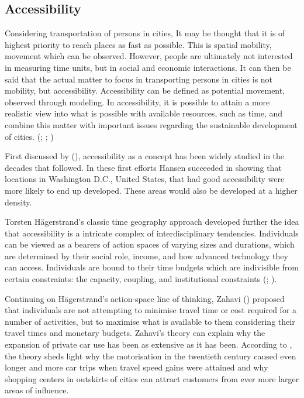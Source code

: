 \newpage
\subsection{Accessibility}
\justify

Considering transportation of persons in cities, It may be thought that it is of highest priority to reach places as fast as possible. This is spatial mobility, movement which can be observed. However, people are ultimately not interested in measuring time units, but in social and economic interactions. It can then be said that the actual matter to focus in transporting persons in cities is not mobility, but accessibility. Accessibility can be defined as potential movement, observed through modeling. In accessibility, it is possible to attain a more realistic view into what is possible with available resources, such as time, and combine this matter with important issues regarding the sustainable development of cities. (\cite{Hodge1997}; \cite{Tenkanen2017}; \cite{Cervero2017})

First discussed by \citeauthor{Hansen1959} (\citeyear{Hansen1959}), accessibility as a concept has been widely studied in the decades that followed. In these first efforts Hansen succeeded in showing that locations in Washington D.C., United States, that had good accessibility were more likely to end up developed. These areas would also be developed at a higher density.

Torsten Hägerstrand's classic time geography approach developed further the idea that accessibility is a intricate complex of interdisciplinary tendencies. Individuals can be viewed as a bearers of action spaces of varying sizes and durations, which are determined by their social role, income, and how advanced technology they can access. Individuals are bound to their time budgets which are indivisible from certain constraints: the capacity, coupling, and institutional constraints (\cite{Wegener1999}; \cite{Hagerstrand1970}).

Continuing on Hägerstrand's action-space line of thinking, Zahavi (\citeyear{Zahavi1974}) proposed that individuals are not attempting to minimise travel time or cost required for a number of activities, but to maximise what is available to them considering their travel times and monetary budgets. Zahavi's theory can explain why the expansion of private car use has been as extensive as it has been. According to , the theory sheds light why the motorisation in the twentieth century caused even longer and more car trips when travel speed gains were attained and why shopping centers in outskirts of cities can attract customers from ever more larger areas of influence.

